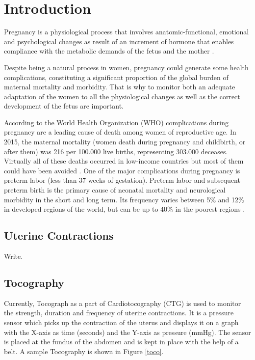 \documentclass[bioengineering,article,submit,moreauthors,pdftex,10pt,a4paper]{mdpi}
\begin{document}
\section{Introduction}

Pregnancy is a physiological process that involves anatomic-functional, emotional and psychological changes as result of an increment of hormone that enables compliance with the metabolic demands of the fetus and the mother \cite{ref-weisswolfe}.

Despite being a natural process in women, pregnancy could generate some health complications, constituting a significant proportion of the global burden of maternal mortality and morbidity. That is why to monitor both an adequate adaptation of the women to all the physiological changes as well as the correct development of the fetus are important.

According to the World Health Organization (WHO) complications during pregnancy are a leading cause of death among women of reproductive age. In 2015, the maternal mortality (women death during pregnancy and childbirth, or after them) was 216 per 100.000 live births, representing 303.000 deceases. Virtually all of these deaths occurred in low-income countries but most of them could have been avoided \cite{ref-alkema}. One of the major complications during pregnancy is preterm labor (less than 37 weeks of gestation). Preterm labor and subsequent preterm birth is the primary cause of neonatal mortality and neurological morbidity in the short and long term. Its frequency varies between 5\% and 12\% in developed regions of the world, but can be up to 40\% in the poorest regions \cite{ref-villa}. 


\subsection{Uterine Contractions}

Write.


\subsection{Tocography}
Currently, Tocograph as a part of Cardiotocography (CTG) is used to monitor the strength, duration and frequency of uterine contractions. It is a pressure sensor which picks up the contraction of the uterus and displays it on a graph with the X-axis as time (seconds) and the Y-axis as pressure (mmHg). The sensor is placed at the fundus of the abdomen and is kept in place with the help of a belt. A sample Tocography is shown in Figure \ref{toco}.
\end{document}
